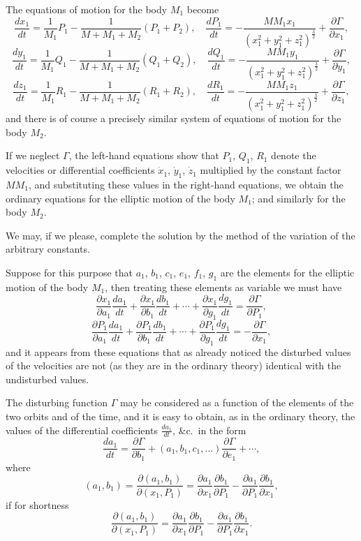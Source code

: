 \documentclass[11pt,a4paper]{book}
\begin{document}
The equations of motion for the body $M_1$ become
\[
\frac{dx_1}{dt} = \frac{1}{M_1}P_1 - \frac{1}{M + M_1 + M_2}(P_1 + P_2), \quad
\frac{dP_1}{dt} = -\frac{MM_1x_1}{(x_1^2 + y_1^2 + z_1^2)^{\frac{3}{2}}} + \frac{\partial \Gamma}{\partial x_1},
\]
\[
\frac{dy_1}{dt} = \frac{1}{M_1}Q_1 - \frac{1}{M + M_1 + M_2}(Q_1 + Q_2), \quad
\frac{dQ_1}{dt} = -\frac{MM_1y_1}{(x_1^2 + y_1^2 + z_1^2)^{\frac{3}{2}}} + \frac{\partial \Gamma}{\partial y_1},
\]
\[
\frac{dz_1}{dt} = \frac{1}{M_1}R_1 - \frac{1}{M + M_1 + M_2}(R_1 + R_2), \quad
\frac{dR_1}{dt} = -\frac{MM_1z_1}{(x_1^2 + y_1^2 + z_1^2)^{\frac{3}{2}}} + \frac{\partial \Gamma}{\partial z_1},
\]
and there is of course a precisely similar system of equations of motion for the body $M_2$.

If we neglect $\Gamma$, the left-hand equations show that $P_1$, $Q_1$, $R_1$ denote the velocities or differential coefficients $\dot{x}_1$, $\dot{y}_1$, $\dot{z}_1$ multiplied by the constant factor $MM_1$, and substituting these values in the right-hand equations, we obtain the ordinary equations for the elliptic motion of the body $M_1$; and similarly for the body $M_2$.

We may, if we please, complete the solution by the method of the variation of the arbitrary constants.

Suppose for this purpose that $a_1$, $b_1$, $c_1$, $e_1$, $f_1$, $g_1$ are the elements for the elliptic motion of the body $M_1$, then treating these elements as variable we must have
\[
\frac{\partial x_1}{\partial a_1}\frac{da_1}{dt} + \frac{\partial x_1}{\partial b_1}\frac{db_1}{dt} + \cdots + \frac{\partial x_1}{\partial g_1}\frac{dg_1}{dt} = \frac{\partial \Gamma}{\partial P_1},
\]
\[
\frac{\partial P_1}{\partial a_1}\frac{da_1}{dt} + \frac{\partial P_1}{\partial b_1}\frac{db_1}{dt} + \cdots + \frac{\partial P_1}{\partial g_1}\frac{dg_1}{dt} = -\frac{\partial \Gamma}{\partial x_1},
\]
and it appears from these equations that as already noticed the disturbed values of the velocities are not (as they are in the ordinary theory) identical with the undisturbed values.

The disturbing function $\Gamma$ may be considered as a function of the elements of the two orbits and of the time, and it is easy to obtain, as in the ordinary theory, the values of the differential coefficients $\frac{da_1}{dt}$, \&c.\ in the form
\[
\frac{da_1}{dt} = \frac{\partial \Gamma}{\partial b_1} + (a_1, b_1, c_1, \ldots)\frac{\partial \Gamma}{\partial e_1} + \cdots,
\]
where
\[
(a_1, b_1) = \frac{\partial (a_1, b_1)}{\partial (x_1, P_1)} = \frac{\partial a_1}{\partial x_1}\frac{\partial b_1}{\partial P_1} - \frac{\partial a_1}{\partial P_1}\frac{\partial b_1}{\partial x_1},
\]
if for shortness
\[
\frac{\partial (a_1, b_1)}{\partial (x_1, P_1)} = \frac{\partial a_1}{\partial x_1}\frac{\partial b_1}{\partial P_1} - \frac{\partial a_1}{\partial P_1}\frac{\partial b_1}{\partial x_1}.
\]
\end{document}
